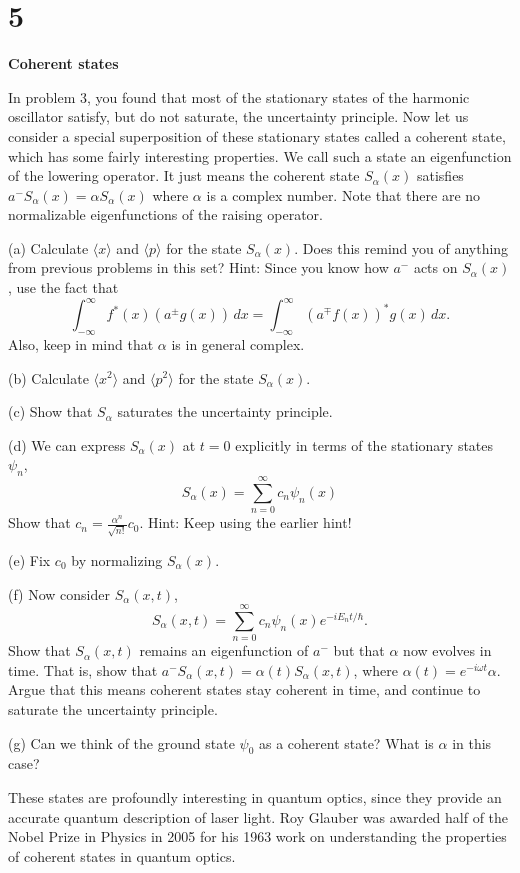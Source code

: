 \documentclass{article}
\begin{document}
\section*{5}
\begin{ques}\label{q5}
\textbf{Coherent states}

In problem 3, you found that most of the stationary states of the harmonic oscillator satisfy,
but do not saturate, the uncertainty principle. Now let us consider a special superposition of
these stationary states called a coherent state, which has some fairly interesting properties.
We call such a state an eigenfunction of the lowering operator. It just means the coherent
state $S_\alpha(x)$ satisfies $a^- S_\alpha(x) = \alpha S_\alpha(x)$ where $\alpha$ is a complex number.
Note that there are no normalizable eigenfunctions of the raising operator.

(a) Calculate $\langle x \rangle$ and $\langle p \rangle$ for the state $S_\alpha(x)$. Does this remind you of anything from
previous problems in this set? Hint: Since you know how $a^-$ acts on $S_\alpha(x)$, use the
fact that
\[
\int_{-\infty}^{\infty} f^*(x)(a^\pm g(x))\,dx
= \int_{-\infty}^{\infty} (a^\mp f(x))^* g(x)\,dx.
\]
Also, keep in mind that $\alpha$ is in general complex.

(b) Calculate $\langle x^2 \rangle$ and $\langle p^2 \rangle$ for the state $S_\alpha(x)$.

(c) Show that $S_\alpha$ saturates the uncertainty principle.

(d) We can express $S_\alpha(x)$ at $t = 0$ explicitly in terms of the stationary states $\psi_n$,
\[
S_\alpha(x) = \sum_{n=0}^{\infty} c_n \psi_n(x)
\]
Show that $c_n = \frac{\alpha^n}{\sqrt{n!}} c_0$. Hint: Keep using the earlier hint!

(e) Fix $c_0$ by normalizing $S_\alpha(x)$.

(f) Now consider $S_\alpha(x, t)$,
\[
S_\alpha(x, t) = \sum_{n=0}^{\infty} c_n \psi_n(x)e^{-iE_n t/\hbar}.
\]
Show that $S_\alpha(x, t)$ remains an eigenfunction of $a^-$ but that $\alpha$ now evolves in time.
That is, show that $a^- S_\alpha(x, t) = \alpha(t) S_\alpha(x, t)$, where $\alpha(t) = e^{-i\omega t}\alpha$.
Argue that this means coherent states stay coherent in time, and continue to saturate the
uncertainty principle.

(g) Can we think of the ground state $\psi_0$ as a coherent state? What is $\alpha$ in this case?

These states are profoundly interesting in quantum optics, since they provide an accurate
quantum description of laser light. Roy Glauber was awarded half of the Nobel Prize in
Physics in 2005 for his 1963 work on understanding the properties of coherent states in
quantum optics.
\end{ques}
\end{document}
